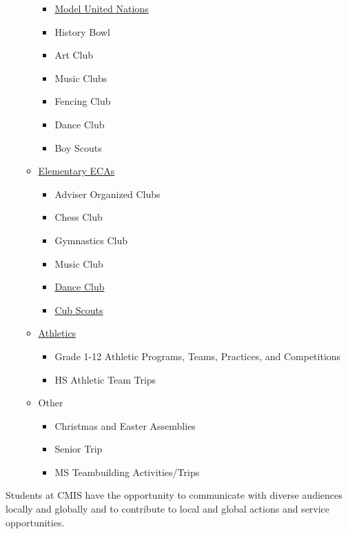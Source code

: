 \begin{findings}
\begin{itemize}
\begin{itemize}
\begin{itemize}
\item \href{http://gallery.cmis.ac.th/2016-2017/MUN/}{Model United Nations}
\item History Bowl
\item Art Club
\item Music Clubs
\item Fencing Club
\item Dance Club
\item Boy Scouts
\end{itemize}
\item \href{http://blogs.cmis.ac.th/eagles/clubs-activities/es/}{Elementary ECAs}
\begin{itemize}
\item Adviser Organized Clubs
\item Chess Club
\item Gymnastics Club
\item Music Club
\item \href{http://gallery.cmis.ac.th/2016-2017/respect_the_beat/}{Dance Club}
\item \href{http://blogs.cmis.ac.th/newsletter/2016/09/16/cub-scouts-returning-to-cmis/}{Cub Scouts}
\end{itemize}
\item \href{http://blogs.cmis.ac.th/eagles/athletics/}{Athletics}
\begin{itemize}
\item Grade 1-12 Athletic Programs, Teams, Practices, and Competitions
\item HS Athletic Team Trips
\end{itemize}
\item Other
\begin{itemize}
\item Christmas and Easter Assemblies
\item Senior Trip
\item MS Teambuilding Activities/Trips
\end{itemize}
\end{itemize}
\end{itemize}


Students at CMIS have the opportunity to communicate with  diverse audiences locally and globally and to contribute to local and global actions and service opportunities.


\end{findings}
